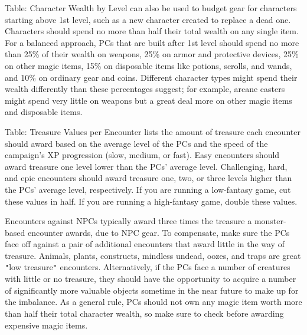 Table: Character Wealth by Level can also be used to budget gear for characters starting above 1st level, such as a new character created to replace a dead one. Characters should spend no more than half their total wealth on any single item. For a balanced approach, PCs that are built after 1st level should spend no more than 25\% of their wealth on weapons, 25\% on armor and protective devices, 25\% on other magic items, 15\% on disposable items like potions, scrolls, and wands, and 10\% on ordinary gear and coins. Different character types might spend their wealth differently than these percentages suggest; for example, arcane casters might spend very little on weapons but a great deal more on other magic items and disposable items.
				
Table: Treasure Values per Encounter lists the amount of treasure each encounter should award based on the average level of the PCs and the speed of the campaign's XP progression (slow, medium, or fast). Easy encounters should award treasure one level lower than the PCs' average level. Challenging, hard, and epic encounters should award treasure one, two, or three levels higher than the PCs' average level, respectively. If you are running a low-fantasy game, cut these values in half. If you are running a high-fantasy game, double these values.
								
Encounters against NPCs typically award three times the treasure a monster-based encounter awards, due to NPC gear. To compensate, make sure the PCs face off against a pair of additional encounters that award little in the way of treasure. Animals, plants, constructs, mindless undead, oozes, and traps are great \texttt{{}"{}}low treasure\texttt{{}"{}} encounters. Alternatively, if the PCs face a number of creatures with little or no treasure, they should have the opportunity to acquire a number of significantly more valuable objects sometime in the near future to make up for the imbalance. As a general rule, PCs should not own any magic item worth more than half their total character wealth, so make sure to check before awarding expensive magic items.

